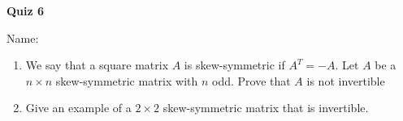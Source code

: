 \documentclass{article}
\begin{document}
\begin{center}
    {\bf Quiz 6}
\end{center}
Name:


\begin{enumerate}
    \item
        We say that a square matrix $A$ is skew-symmetric if $A^T=-A$. Let $A$
        be a $n\times n$ skew-symmetric matrix with $n$ odd. Prove that $A$ is
        not invertible
        \vfill
    \item
        Give an example of a $2\times 2$ skew-symmetric matrix that is
        invertible.
        \vfill
\end{enumerate}
    
\end{document}
